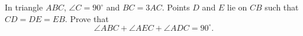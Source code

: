 In triangle $ABC$, $\angle C=90^\circ$ and $BC=3AC$. Points $D$ and $E$ lie on $CB$ such that $CD=DE=EB$. Prove that
\[\angle ABC+\angle AEC+\angle ADC=90^\circ .\]
